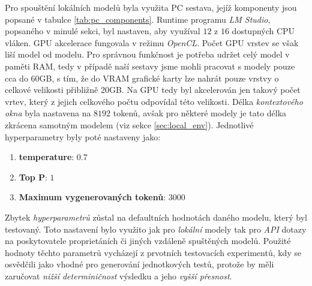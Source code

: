\documentclass[czech, ma, kiv, he, iso690alph, pdf, viewonly]{fasthesis}
\begin{document}
            Pro spouštění lokálních modelů byla využita PC sestava, jejíž komponenty jsou popsané v tabulce \ref{tab:pc_components}. Runtime programu \textit{LM Studio}, popsaného v minulé sekci, byl nastaven, aby využíval \(12\) z \(16\) dostupných CPU vláken. GPU akcelerace fungovala v režimu \textit{OpenCL}. Počet GPU vrstev se však liší model od modelu. Pro správnou funkčnost je potřeba udržet celý model v paměti RAM, tedy v případě naší sestavy jsme mohli pracovat s modely pouze cca do 60GB, s tím, že do VRAM grafické karty lze nahrát pouze vrstvy o celkové velikosti přibližně 20GB. Na GPU tedy byl akcelerován jen takový počet vrtev, který z jejich celkového počtu odpovídal této velikosti. Délka \textit{kontextového okna} byla nastavena na \(8 192\) \gls{token}ů, avšak pro některé modely je tato délka zkrácena samotným modelem (viz sekce \ref{sec:local_env}). Jednotlivé hyperparametry byly poté nastaveny jako:
            \begin{enumerate}
                \item \textbf{\gls{temperature}}: \(0.7\)
                \item \textbf{Top P}: \(1\)
                \item \textbf{Maximum vygenerovaných tokenů}: \(3000\)
            \end{enumerate}
            Zbytek \emph{hyperparametrů} zůstal na defaultních hodnotách daného modelu, který byl testovaný. Toto nastavení bylo využito jak pro \textit{lokální} modely tak pro \textit{API} dotazy na poskytovatele proprietáních či jiných vzdáleně spuštěných modelů. Použité hodnoty těchto parametrů vycházejí z prvotních testovacích experimentů, kdy se osvědčili jako vhodné pro generování jednotkových testů, protože by měli zaručovat \textit{nižší determiničnost} výsledku a jeho \textit{vyšší přesnost}.
\end{document}
